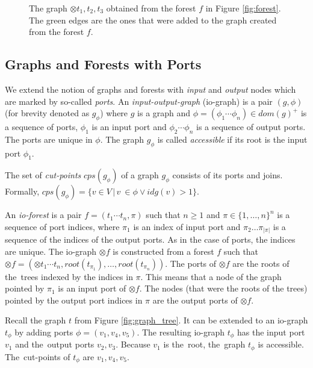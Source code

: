 	\begin{figure}[bth]
	\begin{center}
		
		\caption{The graph $\otimes t_1,t_2,t_3$ obtained from the forest $f$ in Figure \ref{fig:forest}.
		The green edges are the ones that were added to the graph created from the forest $f$.}
	  \label{fig:forest_graph}
	\end{center}
	\end{figure}
\vspace{-0.5cm}
\eexmp

\subsection{Graphs and Forests with Ports}
\label{subsec:gfp}

We extend the notion of graphs and forests with \emph{input} and \emph{output} nodes which are marked by so-called \emph{ports}.
An \emph{input-output-graph} (io-graph) is a pair $(g,\phi)$ (for brevity denoted as $g_\phi$)
where $g$ is a graph and $\phi=(\phi_1 \cdots \phi_n) \in dom(g)^+$ is a sequence of ports, $\phi_1$
is an input port and $\phi_2 \cdots \phi_n$ is a sequence of output ports.
The ports are unique in $\phi$.
The graph $g_\phi$ is called \emph{accessible} if its root is the input port $\phi_1$.

The set of \emph{cut-points} $cps(g_\phi)$ of a graph $g_\phi$ consists of its ports
and joins.
Formally, $cps(g_\phi)=\{v \in V\,|\, v~\in \phi \vee idg(v) > 1\}$.

An \emph{io-forest} is a pair $f=(t_1 \cdots t_n, \pi)$ such that $n \geq 1$ and $\pi \in \{1,\ldots,n\}^n$
is a sequence of port indices, where $\pi_1$ is an index of input port and $\pi_2 \ldots \pi_{|\pi|}$ is a sequence of
the indices of the output ports.
As in the case of ports, the indices are unique.
The io-graph $\otimes f$ is constructed from a forest $f$ such that
$\otimes f = (\otimes t_1 \cdots t_n,root(t_{\pi_{1}}),\ldots,root(t_{\pi_{n}}))$.
The ports of $\otimes f$ are the roots of the~trees indexed by the indices in $\pi$.
This means that a node of the graph pointed by $\pi_1$ is an input port of $\otimes f$.
The nodes (that were the roots of the trees) pointed by the output port indices in $\pi$ are the output ports of $\otimes f$.

\bexmp
Recall the graph $t$ from Figure \ref{fig:graph_tree}.
It can be extended to an io-graph $t_\phi$ by adding ports $\phi=(v_1,v_4,v_5)$.
The resulting io-graph $t_\phi$ has the input port $v_1$ and the~output ports $v_2,v_3$.
Because $v_1$ is the~root, the~graph $t_\phi$ is accessible.
The~cut-points of $t_\phi$ are $v_1, v_4, v_5$.


